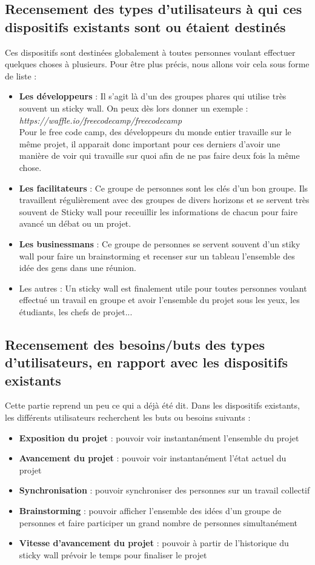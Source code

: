 \documentclass{article}
\begin{document}
\subsection{Recensement des types d’utilisateurs à qui ces dispositifs existants sont ou étaient destinés}
\hspace*{0.6cm}Ces dispositifs sont destinées globalement à toutes personnes voulant effectuer quelques choses à plusieurs. Pour être plus précis, nous allons voir cela sous forme de liste :
\vspace{0.2cm}
\begin{itemize}
  \item \textbf{Les développeurs} : Il s'agit là d'un des groupes phares qui utilise très souvent un sticky wall. On peux dès lors donner un exemple : \textit{https://waffle.io/freecodecamp/freecodecamp}\\
Pour le free code camp, des développeurs du monde entier travaille sur le même projet, il apparait donc important pour ces derniers d'avoir une manière de voir qui travaille sur quoi afin de ne pas faire deux fois la même chose.
  \item \textbf{Les facilitateurs} : Ce groupe de personnes sont les clés d'un bon groupe. Ils travaillent régulièrement avec des groupes de divers horizons et se servent très souvent de Sticky wall pour receuillir les informations de chacun pour faire avancé un débat ou un projet.
  \item \textbf{Les businessmans} : Ce groupe de personnes se servent souvent d'un stiky wall pour faire un brainstorming et recenser sur un tableau l'ensemble des idée des gens dans une réunion.
  \item {Les autres} : Un sticky wall est finalement utile pour toutes personnes voulant effectué un travail en groupe et avoir l'ensemble du projet sous les yeux, les étudiants, les chefs de projet...
\end{itemize}
\subsection{Recensement des besoins/buts des types d’utilisateurs, en rapport avec les dispositifs existants}
\hspace*{0.6cm}Cette partie reprend un peu ce qui a déjà été dit. Dans les dispositifs existants, les différents utilisateurs recherchent les buts ou besoins suivants :
\vspace{0.2cm}
\begin{itemize}
  \item \textbf{Exposition du projet} : pouvoir voir instantanément l'ensemble du projet
  \item \textbf{Avancement du projet} : pouvoir voir instantanément l'état actuel du projet
  \item \textbf{Synchronisation} : pouvoir synchroniser des personnes sur un travail collectif
  \item \textbf{Brainstorming} : pouvoir afficher l'ensemble des idées d'un groupe de personnes et faire participer un grand nombre de personnes simultanément
  \item \textbf{Vitesse d'avancement du projet} : pouvoir à partir de l'historique du sticky wall prévoir le temps pour finaliser le projet
\end{itemize}
\end{document}
